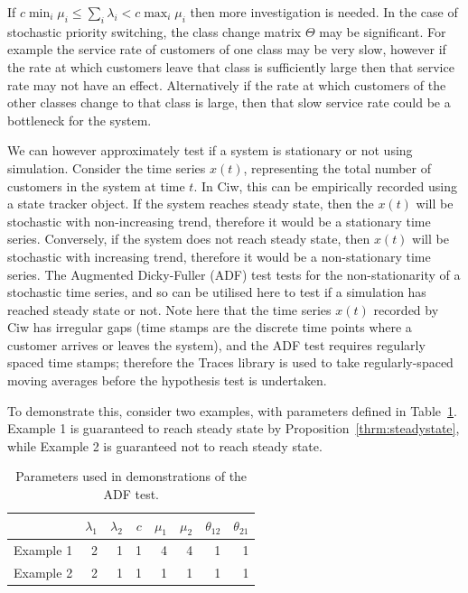 \documentclass{article}
\begin{document}
If $c \min_i \mu_i \leq \sum_i \lambda_i < c \max_i \mu_i$ then more
investigation is needed. In the case of stochastic priority switching, the class
change matrix $\Theta$ may be significant.
For example the service rate of customers of one class may be very slow, however
if the rate at which customers leave that class is sufficiently large then that
service rate may not have an effect.
Alternatively if the rate at which customers of the other classes change to that
class is large, then that slow service rate could be a bottleneck for the
system.

We can however approximately test if a system is stationary or not using
simulation. Consider the time series $x(t)$, representing the total number of
customers in the system at time $t$.
In Ciw, this can be empirically recorded using a state tracker object.
If the system reaches steady state, then the $x(t)$ will be stochastic with
non-increasing trend, therefore it would be a stationary time series.
Conversely, if the system does not reach steady state, then $x(t)$ will be
stochastic with increasing trend, therefore it would be a non-stationary time
series.
The Augmented Dicky-Fuller (ADF) test \cite{dickyfuller79} tests for the
non-stationarity of a stochastic time series, and so can be utilised here to
test if a simulation has reached steady state or not.
Note here that the time series $x(t)$ recorded by Ciw has irregular gaps (time
stamps are the discrete time points where a customer arrives or leaves the
system), and the ADF test requires regularly spaced time stamps; therefore the
Traces library \cite{traces} is used to take regularly-spaced moving averages
before the hypothesis test is undertaken.

To demonstrate this, consider two examples, with parameters defined in
Table~\ref{tbl:adf_example_parameters}.
Example 1 is guaranteed to reach steady state by
Proposition~\ref{thrm:steadystate}, while Example 2 is guaranteed not to reach
steady state.

\begin{table}
\begin{center}
\begin{tabular}{rrrrrrrr}
\toprule
 & $\lambda_1$ & $\lambda_2$ & $c$ & $\mu_1$ & $\mu_2$ & $\theta_{12}$ & $\theta_{21}$ \\
\midrule
Example 1 & 2 & 1 & 1 & 4 & 4 & 1 & 1\\ 
Example 2 & 2 & 1 & 1 & 1 & 1 & 1 & 1\\ 
\bottomrule
\end{tabular}
\end{center}
\caption{Parameters used in demonstrations of the ADF test.}
\label{tbl:adf_example_parameters}
\end{table}
\end{document}
